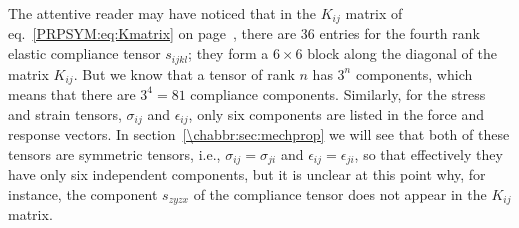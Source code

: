 The attentive reader may have noticed that in the $K_{ij}$ matrix of eq.~\ref{PRPSYM:eq:Kmatrix} on page~\pageref{PRPSYM:eq:Kmatrix}, there are $36$ entries for the fourth rank elastic compliance tensor $s_{ijkl}$; they form a $6\times 6$ block along the diagonal of the matrix $K_{ij}$. But we know that a tensor of rank $n$ has $3^n$ components, which means that there are $3^4=81$ compliance components.  Similarly, for the stress and strain tensors, $\sigma_{ij}$ and $\epsilon_{ij}$, only six components are listed in the force and response vectors.  In section~\ref{\chabbr:sec:mechprop} we will see that both of these tensors are symmetric tensors, i.e., $\sigma_{ij}=\sigma_{ji}$ and $\epsilon_{ij}=\epsilon_{ji}$, so that effectively they have only six independent components, but it is unclear at this point why, for instance, the component $s_{zyzx}$ of the compliance tensor does not appear in the $K_{ij}$ matrix.

